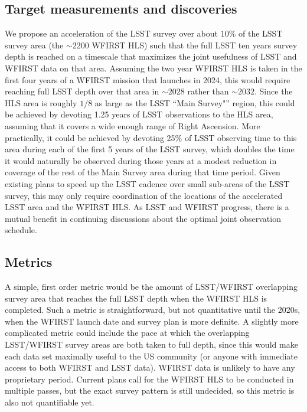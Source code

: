 
\subsection{Target measurements and discoveries}
\label{sec:\secname:targets}

We propose an acceleration of the LSST survey over about $10\%$ of the
LSST survey area (the $\sim2200$ WFIRST HLS) such that the full LSST ten
years survey depth is reached on a timescale that maximizes the joint
usefulness of LSST and WFIRST data on that area.  Assuming the two year
WFIRST HLS is taken in the first four years of a WFIRST mission that
launches in 2024, this would require reaching full LSST depth over that
area in $\sim2028$ rather than $\sim2032$. Since the HLS area is roughly
$1/8$ as large as the LSST ``Main Survey"'' region, this could be
achieved by devoting 1.25 years of LSST observations to the HLS area,
assuming that it covers a wide enough range of Right Ascension.  More
practically, it could be achieved by devoting 25\% of LSST observing
time to this area during each of the first 5 years of the LSST survey,
which doubles the time it would naturally be observed during those years
at a modest reduction in coverage of the rest of the Main Survey area
during that time period.   Given existing plans to speed up the LSST
cadence over small sub-areas of the LSST survey, this may only require
coordination of the locations of the accelerated LSST area and the
WFIRST HLS. As LSST and WFIRST progress, there is a mutual benefit in
continuing discussions about the optimal joint observation schedule.




\subsection{Metrics}
\label{sec:\secname:metrics}

A simple, first order metric would be the amount of LSST/WFIRST
overlapping survey area that reaches the full LSST depth when the WFIRST
HLS is completed.  Such a metric is straightforward, but not
quantitative until the 2020s, when the WFIRST launch date and survey
plan is more definite.  A slightly more complicated metric could include
the pace at which the overlapping LSST/WFIRST survey areas are both
taken to full depth, since this would make each data set maximally
useful to the US community (or anyone with immediate access to both
WFIRST and LSST data).  WFIRST data is unlikely to have any proprietary
period.  Current plans call for the WFIRST HLS to be conducted in
multiple passes, but the exact survey pattern is still undecided, so this
metric is also not quantifiable yet.


